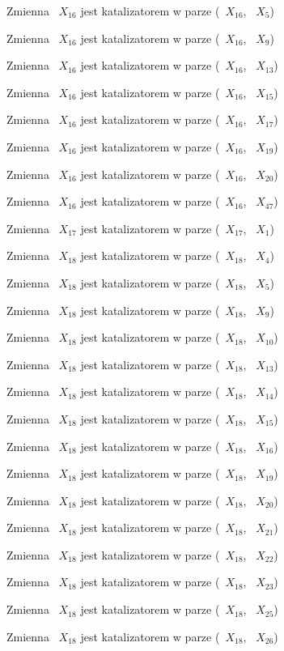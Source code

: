\documentclass{article}
\begin{document}
Zmienna ~$X_{16}$ jest katalizatorem w parze (~$X_{16}$, ~$X_{5}$)

Zmienna ~$X_{16}$ jest katalizatorem w parze (~$X_{16}$, ~$X_{9}$)

Zmienna ~$X_{16}$ jest katalizatorem w parze (~$X_{16}$, ~$X_{13}$)

Zmienna ~$X_{16}$ jest katalizatorem w parze (~$X_{16}$, ~$X_{15}$)

Zmienna ~$X_{16}$ jest katalizatorem w parze (~$X_{16}$, ~$X_{17}$)

Zmienna ~$X_{16}$ jest katalizatorem w parze (~$X_{16}$, ~$X_{19}$)

Zmienna ~$X_{16}$ jest katalizatorem w parze (~$X_{16}$, ~$X_{20}$)

Zmienna ~$X_{16}$ jest katalizatorem w parze (~$X_{16}$, ~$X_{47}$)

Zmienna ~$X_{17}$ jest katalizatorem w parze (~$X_{17}$, ~$X_{1}$)

Zmienna ~$X_{18}$ jest katalizatorem w parze (~$X_{18}$, ~$X_{4}$)

Zmienna ~$X_{18}$ jest katalizatorem w parze (~$X_{18}$, ~$X_{5}$)

Zmienna ~$X_{18}$ jest katalizatorem w parze (~$X_{18}$, ~$X_{9}$)

Zmienna ~$X_{18}$ jest katalizatorem w parze (~$X_{18}$, ~$X_{10}$)

Zmienna ~$X_{18}$ jest katalizatorem w parze (~$X_{18}$, ~$X_{13}$)

Zmienna ~$X_{18}$ jest katalizatorem w parze (~$X_{18}$, ~$X_{14}$)

Zmienna ~$X_{18}$ jest katalizatorem w parze (~$X_{18}$, ~$X_{15}$)

Zmienna ~$X_{18}$ jest katalizatorem w parze (~$X_{18}$, ~$X_{16}$)

Zmienna ~$X_{18}$ jest katalizatorem w parze (~$X_{18}$, ~$X_{19}$)

Zmienna ~$X_{18}$ jest katalizatorem w parze (~$X_{18}$, ~$X_{20}$)

Zmienna ~$X_{18}$ jest katalizatorem w parze (~$X_{18}$, ~$X_{21}$)

Zmienna ~$X_{18}$ jest katalizatorem w parze (~$X_{18}$, ~$X_{22}$)

Zmienna ~$X_{18}$ jest katalizatorem w parze (~$X_{18}$, ~$X_{23}$)

Zmienna ~$X_{18}$ jest katalizatorem w parze (~$X_{18}$, ~$X_{25}$)

Zmienna ~$X_{18}$ jest katalizatorem w parze (~$X_{18}$, ~$X_{26}$)
\end{document}
